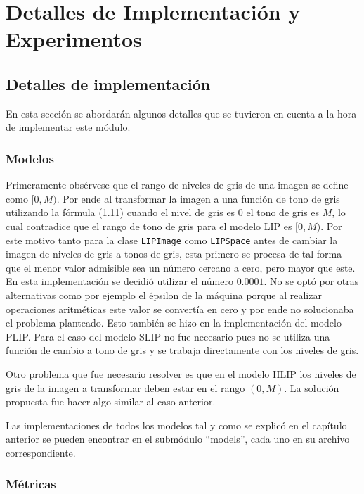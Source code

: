 \chapter{Detalles de Implementación y Experimentos}\label{chapter:implementation}

\section{Detalles de implementaci\'on}

En esta secci\'on se abordar\'an algunos detalles que se tuvieron en cuenta a la hora de implementar este m\'odulo.

\subsection{Modelos}

Primeramente obs\'ervese que el rango de niveles de gris de una imagen se define como $[0,M)$. Por ende al transformar la imagen a una funci\'on de tono de gris utilizando la f\'ormula (1.11) cuando el nivel de gris es 0 el tono de gris es $M$, lo cual contradice que el rango de tono de gris para el modelo LIP es $[0,M)$. Por este motivo tanto para la clase \verb|LIPImage| como \verb|LIPSpace| antes de cambiar la imagen de niveles de gris a tonos de gris, esta primero se procesa de tal forma que el menor valor admisible sea un n\'umero cercano a cero, pero mayor que este. En esta implementaci\'on se decidi\'o utilizar el n\'umero $0.0001$. No se opt\'o por otras alternativas como por ejemplo el \'epsilon de la m\'aquina porque al realizar operaciones aritm\'eticas este valor se convert\'ia en cero y por ende no solucionaba el problema planteado. Esto tambi\'en se hizo en la implementaci\'on del modelo PLIP. Para el caso del modelo SLIP no fue necesario pues no se utiliza una funci\'on de cambio a tono de gris y se trabaja directamente con los niveles de gris.

Otro problema que fue necesario resolver es que en el modelo HLIP los niveles de gris de la imagen a transformar deben estar en el rango $(0,M)$. La soluci\'on propuesta fue hacer algo similar al caso anterior.

Las implementaciones de todos los modelos tal y como se explic\'o en el cap\'itulo anterior se pueden encontrar en el subm\'odulo ``models'', cada uno en su archivo correspondiente.

\subsection{M\'etricas}

